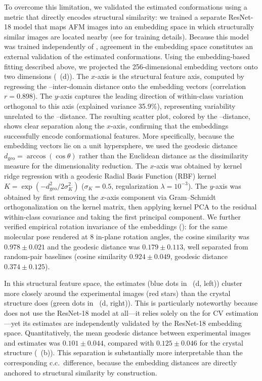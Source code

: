 To overcome this limitation, we validated the estimated conformations using a metric that directly encodes structural similarity: we trained a separate ResNet-18 model \cite{He2016} that maps AFM images into an embedding space in which structurally similar images are located nearby (see  for training details).
Because this model was trained independently of \Model, agreement in the embedding space constitutes an external validation of the estimated conformations.
Using the embedding-based fitting described above, we projected the 256-dimensional embedding vectors onto two dimensions (~(d)).
The $x$-axis is the structural feature axis, computed by regressing the \acdii--\acdiv inter-domain distance onto the embedding vectors (correlation $r = 0.898$).
The $y$-axis captures the leading direction of within-class variation orthogonal to this axis (explained variance 35.9\%), representing variability unrelated to the \acdii--\acdiv distance.
The resulting scatter plot, colored by the \acdii--\acdiv distance, shows clear separation along the $x$-axis, confirming that the embeddings successfully encode conformational features.
More specifically, because the embedding vectors lie on a unit hypersphere, we used the geodesic distance $d_{\mathrm{geo}} = \arccos(\cos\theta)$ rather than the Euclidean distance as the dissimilarity measure for the dimensionality reduction.
The $x$-axis was obtained by kernel ridge regression with a geodesic Radial Basis Function (RBF) kernel $K = \exp(-d_{\mathrm{geo}}^2 / 2\sigma_K^2)$ ($\sigma_K = 0.5$, regularization $\lambda = 10^{-3}$).
The $y$-axis was obtained by first removing the $x$-axis component via Gram--Schmidt orthogonalization on the kernel matrix, then applying kernel PCA to the residual within-class covariance and taking the first principal component.
We further verified empirical rotation invariance of the embeddings (): for the same molecular pose rendered at 8 in-plane rotation angles, the cosine similarity was $0.978 \pm 0.021$ and the geodesic distance was $0.179 \pm 0.113$, well separated from random-pair baselines (cosine similarity $0.924 \pm 0.049$, geodesic distance $0.374 \pm 0.125$).

In this structural feature space, the \Model estimates (blue dots in ~(d, left)) cluster more closely around the experimental images (red stars) than the crystal structure does (green dots in ~(d, right)).
This is particularly noteworthy because \Model does not use the ResNet-18 model at all---it relies solely on the \gcnn for CV estimation---yet its estimates are independently validated by the ResNet-18 embedding space.
Quantitatively, the mean geodesic distance between experimental images and \Model estimates was $0.101 \pm 0.044$, compared with $0.125 \pm 0.046$ for the crystal structure (~(b)).
This separation is substantially more interpretable than the corresponding c.c.\ difference, because the embedding distances are directly anchored to structural similarity by construction.

